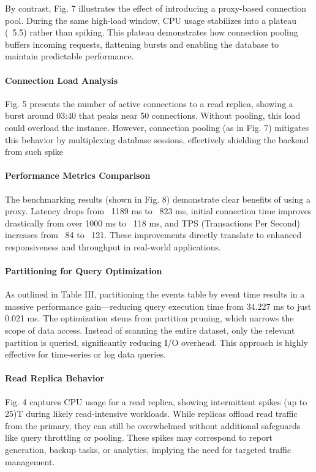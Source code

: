 \documentclass[conference]{IEEEtran}
\begin{document}
By contrast, Fig. 7 illustrates the effect of introducing a proxy-based connection pool. During the same high-load window, CPU usage stabilizes into a plateau (~5.5) rather than spiking. This plateau demonstrates how connection pooling buffers incoming requests, flattening bursts and enabling the database to maintain predictable performance.

\paragraph{Connection Load Analysis}
Fig. 5 presents the number of active connections to a read replica, showing a burst around 03:40 that peaks near 50 connections. Without pooling, this load could overload the instance. However, connection pooling (as in Fig. 7) mitigates this behavior by multiplexing database sessions, effectively shielding the backend from such spike

\paragraph{Performance Metrics Comparison}
The benchmarking results (shown in Fig. 8) demonstrate clear benefits of using a proxy. Latency drops from ~1189 ms to ~823 ms, initial connection time improves drastically from over 1000 ms to ~118 ms, and TPS (Transactions Per Second) increases from ~84 to ~121. These improvements directly translate to enhanced responsiveness and throughput in real-world applications.

\paragraph{Partitioning for Query Optimization}
As outlined in Table III, partitioning the events table by event time results in a massive performance gain—reducing query execution time from 34.227 ms to just 0.021 ms. The optimization stems from partition pruning, which narrows the scope of data access. Instead of scanning the entire dataset, only the relevant partition is queried, significantly reducing I/O overhead. This approach is highly effective for time-series or log data queries.

\paragraph{Read Replica Behavior}
Fig. 4 captures CPU usage for a read replica, showing intermittent spikes (up to 25)T during likely read-intensive workloads. While replicas offload read traffic from the primary, they can still be overwhelmed without additional safeguards like query throttling or pooling. These spikes may correspond to report generation, backup tasks, or analytics, implying the need for targeted traffic management.
\end{document}

